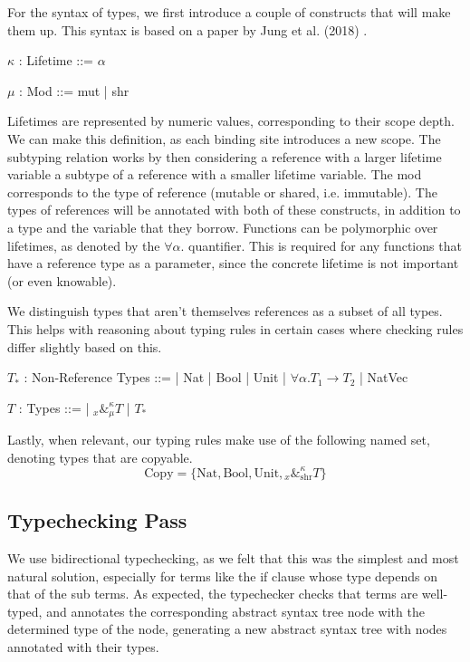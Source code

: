 \documentclass[letterpaper,11pt]{article}
\begin{document}
For the syntax of types, we first introduce a couple of constructs that will make
them up. This syntax is based on a paper by Jung et al. (2018) \cite{rustbelt1}.
\begin{center}
    \begin{bnf}
        $\kappa$ : \textsf{Lifetime} ::= $\alpha$
    \end{bnf}

    \begin{bnf}
        $\mu$ : \textsf{Mod} ::= mut | shr
    \end{bnf}
\end{center}
Lifetimes are represented by numeric values, corresponding to their scope depth.
We can make this definition, as each binding site introduces a new scope. The
subtyping relation works by then considering a reference with a larger lifetime variable a subtype
of a reference with a smaller lifetime variable. The mod corresponds to the type
of reference (mutable or shared, i.e. immutable). The types of references will be
annotated with both of these constructs, in addition to a type and the variable that they borrow.
Functions can be polymorphic over lifetimes, as denoted by the $\forall \alpha.$ quantifier. This is required for any functions
that have a reference type as a parameter, since the concrete lifetime is not important (or even knowable).

We distinguish types that aren't themselves references as a subset of all types.
This helps with reasoning about typing rules in certain cases where
checking rules differ slightly based on this.
\begin{center}
    \begin{bnf}
        $T_*$ : \textsf{Non-Reference Types} ::=
        | Nat | Bool | Unit | $\forall\alpha.T_1\rightarrow T_2$ | NatVec
    \end{bnf}
    
    \begin{bnf}
        $T$ : \textsf{Types} ::=
        | ${}_{x}\&^\kappa_\mu T$ | $T_*$
    \end{bnf}
\end{center}

Lastly, when relevant, our typing rules make use of the following named set,
denoting types that are copyable.
$$\text{Copy}=\{\text{Nat}, \text{Bool}, \text{Unit},{}_{x}\&^\kappa_{\text{shr}} T\}$$

\subsection{Typechecking Pass}
We use bidirectional typechecking, as we felt that this was the simplest and
most natural solution, especially for terms like the if clause whose type depends
on that of the sub terms. As expected, the typechecker checks that terms are
well-typed, and annotates the corresponding abstract syntax tree node with
the determined type of the node, generating a new abstract syntax tree with nodes
annotated with their types.
\end{document}
